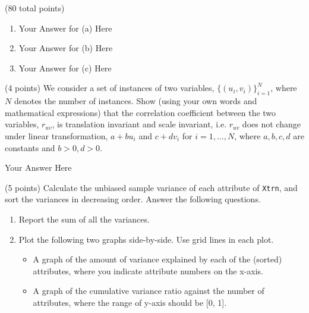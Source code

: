 \documentclass[12pt]{article}
\begin{document}
\begin{question}{(80 total points) \qOneTitle}
\begin{subquestion}
  \begin{answerbox}{25em}
    \begin{enumerate}
    \item Your Answer for (a) Here
    \item Your Answer for (b) Here
    \item Your Answer for (c) Here
    \end{enumerate}
  \end{answerbox}
  


\end{subquestion}

\begin{subquestion}{(4 points)
    We consider a set of instances of two variables, $\{(u_i, v_i)\}_{i=1}^N$,
    where $N$ denotes the number of instances.
    Show (using your own words and mathematical expressions) that the correlation coefficient between the two variables, $r_{uv}$, is translation invariant and scale invariant,
    i.e. $r_{uv}$ does not change under linear transformation, $a + bu_i$ and $c + dv_i$ for $i=1,\ldots,N$, where $a,b,c,d$ are constants and $b>0, d>0$.
    }


  \begin{answerbox}{0.4\textheight}
    Your Answer Here
  \end{answerbox}
  


\end{subquestion}

\begin{subquestion}{(5 points)
    Calculate the unbiased sample variance of each attribute of {\tt Xtrn}, and sort the variances in decreasing order. Answer the following questions.
  }\label{q1:variance}
  \begin{enumerate}\NARROWITEM
  \item Report the sum of all the variances.
  \item Plot the following two graphs side-by-side. Use grid lines in each plot.
    \begin{itemize}\NARROWITEM
    \item A graph of the amount of variance explained by each of the (sorted) attributes, where you indicate attribute numbers on the x-axis.
    \item A graph of the cumulative variance ratio against the number of attributes, where the range of y-axis should be [0, 1].
    \end{itemize}
  \end{enumerate}



\end{subquestion}
\end{question}
\end{document}
